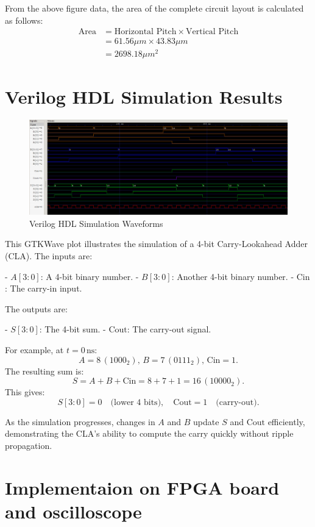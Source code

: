 \documentclass[conference]{IEEEtran}
\begin{document}
From the above figure data, the area of the complete circuit layout is calculated as follows:
\begin{align*}
    \text{Area} &= \text{Horizontal Pitch} \times \text{Vertical Pitch} \\
    &= 61.56 \mu m \times 43.83 \mu m  \\
    &= 2698.18 \mu m^2
\end{align*}


\section{Verilog HDL Simulation Results}

\begin{figure}[h]
    \centering
    \includegraphics[width=1\linewidth]{veriloggtk.png}
    \caption{Verilog HDL Simulation Waveforms}
    \label{fig:verilog_waveform}
\end{figure}

This GTKWave plot illustrates the simulation of a 4-bit Carry-Lookahead Adder (CLA). The inputs are:

- \( A[3:0] \): A 4-bit binary number.
- \( B[3:0] \): Another 4-bit binary number.
- \( \text{Cin} \): The carry-in input.

The outputs are:

- \( S[3:0] \): The 4-bit sum.
- \( \text{Cout} \): The carry-out signal.

For example, at \( t = 0 \, \text{ns} \):
\[
A = 8 \, (1000_2), \, B = 7 \, (0111_2), \, \text{Cin} = 1.
\]
The resulting sum is:
\[
S = A + B + \text{Cin} = 8 + 7 + 1 = 16 \, (10000_2).
\]
This gives:
\[
S[3:0] = 0 \quad \text{(lower 4 bits)}, \quad \text{Cout} = 1 \quad \text{(carry-out)}.
\]

As the simulation progresses, changes in \( A \) and \( B \) update \( S \) and \( \text{Cout} \) efficiently, demonstrating the CLA's ability to compute the carry quickly without ripple propagation.

\section{Implementaion on FPGA board and oscilloscope}
\end{document}
